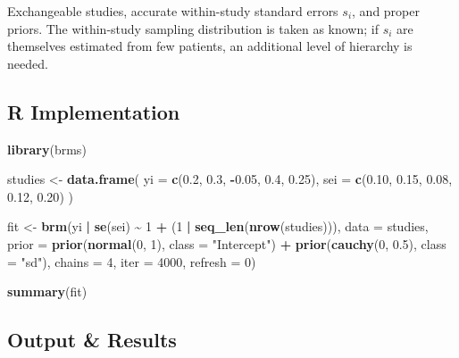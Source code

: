 \documentclass[
]{article}
\newenvironment{Shaded}{\begin{snugshade}}{\end{snugshade}}
\newcommand{\AttributeTok}[1]{\textcolor[rgb]{0.13,0.29,0.53}{#1}}
\newcommand{\DecValTok}[1]{\textcolor[rgb]{0.00,0.00,0.81}{#1}}
\newcommand{\FloatTok}[1]{\textcolor[rgb]{0.00,0.00,0.81}{#1}}
\newcommand{\FunctionTok}[1]{\textcolor[rgb]{0.13,0.29,0.53}{\textbf{#1}}}
\newcommand{\NormalTok}[1]{#1}
\newcommand{\OtherTok}[1]{\textcolor[rgb]{0.56,0.35,0.01}{#1}}
\newcommand{\SpecialCharTok}[1]{\textcolor[rgb]{0.81,0.36,0.00}{\textbf{#1}}}
\newcommand{\StringTok}[1]{\textcolor[rgb]{0.31,0.60,0.02}{#1}}
\begin{document}
Exchangeable studies, accurate within-study standard errors \(s_i\), and
proper priors. The within-study sampling distribution is taken as known;
if \(s_i\) are themselves estimated from few patients, an additional
level of hierarchy is needed.

\subsection{R Implementation}\label{r-implementation}

\begin{Shaded}
\begin{Highlighting}[]
\FunctionTok{library}\NormalTok{(brms)}

\NormalTok{studies }\OtherTok{\textless{}{-}} \FunctionTok{data.frame}\NormalTok{(}
  \AttributeTok{yi =} \FunctionTok{c}\NormalTok{(}\FloatTok{0.2}\NormalTok{, }\FloatTok{0.3}\NormalTok{, }\SpecialCharTok{{-}}\FloatTok{0.05}\NormalTok{, }\FloatTok{0.4}\NormalTok{, }\FloatTok{0.25}\NormalTok{),}
  \AttributeTok{sei =} \FunctionTok{c}\NormalTok{(}\FloatTok{0.10}\NormalTok{, }\FloatTok{0.15}\NormalTok{, }\FloatTok{0.08}\NormalTok{, }\FloatTok{0.12}\NormalTok{, }\FloatTok{0.20}\NormalTok{)}
\NormalTok{)}

\NormalTok{fit }\OtherTok{\textless{}{-}} \FunctionTok{brm}\NormalTok{(yi }\SpecialCharTok{|} \FunctionTok{se}\NormalTok{(sei) }\SpecialCharTok{\textasciitilde{}} \DecValTok{1} \SpecialCharTok{+}\NormalTok{ (}\DecValTok{1} \SpecialCharTok{|} \FunctionTok{seq\_len}\NormalTok{(}\FunctionTok{nrow}\NormalTok{(studies))),}
           \AttributeTok{data =}\NormalTok{ studies,}
           \AttributeTok{prior =} \FunctionTok{prior}\NormalTok{(}\FunctionTok{normal}\NormalTok{(}\DecValTok{0}\NormalTok{, }\DecValTok{1}\NormalTok{), }\AttributeTok{class =} \StringTok{"Intercept"}\NormalTok{) }\SpecialCharTok{+}
                   \FunctionTok{prior}\NormalTok{(}\FunctionTok{cauchy}\NormalTok{(}\DecValTok{0}\NormalTok{, }\FloatTok{0.5}\NormalTok{), }\AttributeTok{class =} \StringTok{"sd"}\NormalTok{),}
           \AttributeTok{chains =} \DecValTok{4}\NormalTok{, }\AttributeTok{iter =} \DecValTok{4000}\NormalTok{, }\AttributeTok{refresh =} \DecValTok{0}\NormalTok{)}

\FunctionTok{summary}\NormalTok{(fit)}
\end{Highlighting}
\end{Shaded}

\subsection{Output \& Results}\label{output-results}
\end{document}
